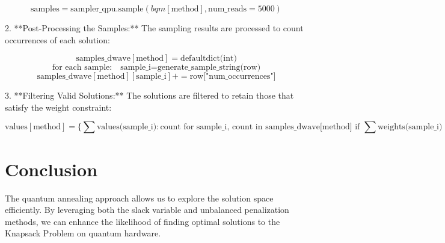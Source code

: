 \documentclass{article}
\begin{document}
   \[
   \text{samples} = \text{sampler\_qpu.sample}(bqm[\text{method}], \text{num\_reads}=5000)
   \]

2. **Post-Processing the Samples:**
   The sampling results are processed to count occurrences of each solution:

   \[
   \text{samples\_dwave}[\text{method}] = \text{defaultdict(int)}
   \]
   \[
   \text{for each sample:} \quad \text{sample\_i} = \text{generate\_sample\_string(row)}
   \]
   \[
   \text{samples\_dwave}[\text{method}][\text{sample\_i}] += \text{row["num\_occurrences"]}
   \]

3. **Filtering Valid Solutions:**
   The solutions are filtered to retain those that satisfy the weight constraint:

   \[
   \text{values}[\text{method}] = \{ \sum \text{values(sample\_i)}: \text{count} \text{ for sample\_i, count in samples\_dwave[method]} \text{ if } \sum \text{weights(sample\_i)} \leq W \}
   \]

\section{Conclusion}

The quantum annealing approach allows us to explore the solution space efficiently. By leveraging both the slack variable and unbalanced penalization methods, we can enhance the likelihood of finding optimal solutions to the Knapsack Problem on quantum hardware.
\end{document}
